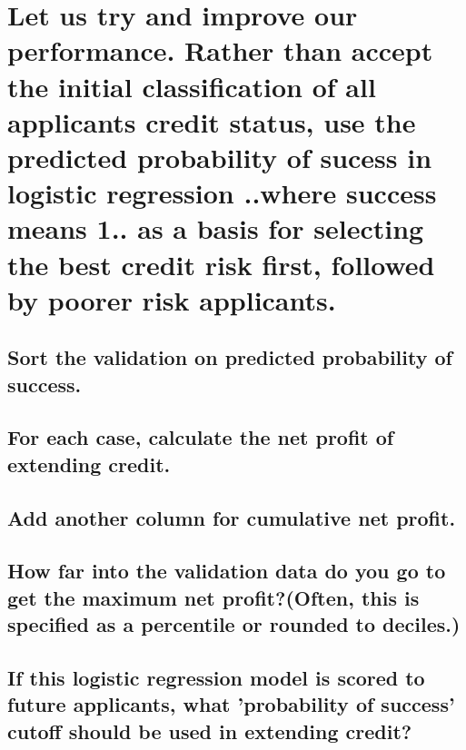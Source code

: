 \section{Let us try and improve our performance. Rather than accept the initial classification of all applicants credit status, use the predicted probability of sucess in logistic regression ..where success means 1.. as a basis for selecting the best credit risk first, followed by poorer risk applicants.}
\subsection{Sort the validation on predicted probability of success.}
\subsection{For each case, calculate the net profit of extending credit.}
\subsection{Add another column for cumulative net profit.}
\subsection{How far into the validation data do you go to get the maximum net profit?(Often, this is specified as a percentile or rounded to deciles.)}
\subsection{If this logistic regression model is scored to future applicants, what 'probability of success' cutoff should be used in extending credit?}